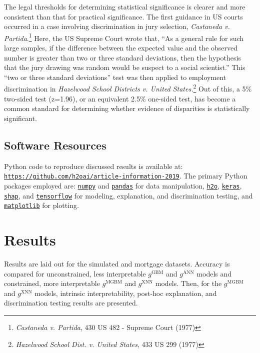 \documentclass[information,article,submit,moreauthors,pdftex]{definitions/mdpi}
\begin{document}
The legal thresholds for determining statistical significance is clearer and more consistent than that for practical significance.  The first guidance in US courts occurred in a case involving discrimination in jury selection, \textit{Castaneda v. Partida}.\footnote{\textit{Castaneda v. Partida}, 430 US 482 - Supreme Court (1977)}   Here, the US Supreme Court wrote that, ``As a general rule for such large samples, if the difference between the expected value and the observed number is greater than two or three standard deviations, then the hypothesis that the jury drawing was random would be suspect to a social scientist.''  This ``two or three standard deviations'' test was then applied to employment discrimination in \textit{Hazelwood School Districts v. United States.}\footnote{\textit{Hazelwood School Dist. v. United States}, 433 US 299 (1977)} Out of this, a 5\% two-sided test (z=1.96), or an equivalent 2.5\% one-sided test, has become a common standard for determining whether evidence of disparities is statistically significant.

\subsection{Software Resources}\label{ssec:soft}

Python code to reproduce discussed results is available at: \texttt{\url{https://github.com/h2oai/article-information-2019}}. The primary Python packages employed are: \href{https://numpy.org/}{\texttt{numpy}} and \href{https://pandas.pydata.org/}{\texttt{pandas}} for data manipulation, \href{https://github.com/h2oai/h2o-3}{\texttt{h2o}}, \href{https://keras.io/}{\texttt{keras}}, \href{https://github.com/slundberg/shap}{\texttt{shap}}, and \href{https://www.tensorflow.org/}{\texttt{tensorflow}} for modeling, explanation, and discrimination testing, and \href{https://matplotlib.org/}{\texttt{matplotlib}} for plotting. 

\section{Results}\label{sec:res}

Results are laid out for the simulated and mortgage datasets. Accuracy is compared for unconstrained, less interpretable $g^{\text{GBM}}$ and $g^{\text{ANN}}$ models and constrained, more interpretable $g^{\text{MGBM}}$ and $g^{\text{XNN}}$ models. Then, for the  $g^{\text{MGBM}}$ and $g^{\text{XNN}}$ models, intrinsic interpretability, post-hoc explanation, and discrimination testing results are presented.
\end{document}
